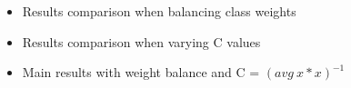 \begin{itemize}
	\item Results comparison when balancing class weights
	\item Results comparison when varying C values
	\item Main results with weight balance and C = $(avg \ x*x)^{-1}$
\end{itemize}